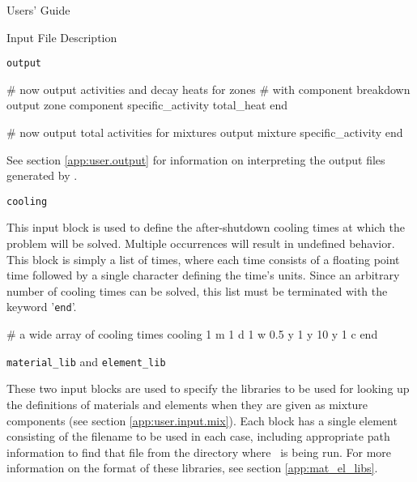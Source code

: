 \begin{chapter}{Users' Guide\label{app:user.guide}}
\begin{section}{Input File Description\label{app:user.input}}
\begin{subsection}{\texttt{output}\label{app:user.input.output}}
\begin{center}
\begin{boxedverbatim}
# now output activities and decay heats for zones
#   with component breakdown
output zone
   component
   specific_activity
   total_heat
end

# now output total activities for mixtures
output mixture
   specific_activity
end
\end{boxedverbatim}
      \end{center}      

      See section \ref{app:user.output} for information on
      interpreting the output files generated by \ALARA.
    \end{subsection}

    \begin{subsection}{\texttt{cooling}\label{app:user.input.cool}}
      
      This input block is used to define the after-shutdown cooling
      times at which the problem will be solved.  Multiple occurrences
      will result in undefined behavior.  This block is simply a list
      of times, where each time consists of a floating point time
      followed by a single character defining the time's units.  Since
      an arbitrary number of cooling times can be solved, this list
      must be terminated with the keyword '\texttt{end}'.

      \begin{center}
        \renewcommand{\baselinestretch}{1}\normalsize
        \begin{boxedverbatim}
# a wide array of cooling times
cooling
     1 m
     1 d    
     1 w
   0.5 y
     1 y
    10 y
     1 c
end          
\end{boxedverbatim}
      \end{center}

    \end{subsection}

    \begin{subsection}{\texttt{material\_lib} and \texttt{element\_lib}\label{app:user.input.matlibs}}
      
      These two input blocks are used to specify the libraries to be
      used for looking up the definitions of materials and elements
      when they are given as mixture components (see section
      \ref{app:user.input.mix}).  Each block has a single element
      consisting of the filename to be used in each case, including
      appropriate path information to find that file from the
      directory where \ALARA\ is being run.  For more information on
      the format of these libraries, see section
      \ref{app:mat_el_libs}.


\end{subsection}
\end{section}
\end{chapter}
